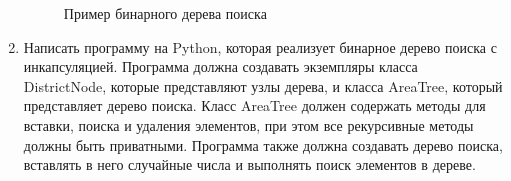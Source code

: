 \begin{enumerate}
\begin{figure}[h]
\centering
{}
\caption{Пример бинарного дерева поиска}
\end{figure}

\item Написать программу на Python, которая реализует бинарное дерево поиска с инкапсуляцией. Программа должна создавать экземпляры класса DistrictNode, которые представляют узлы дерева, и класса AreaTree, который представляет дерево поиска. Класс AreaTree должен содержать методы для вставки, поиска и удаления элементов, при этом все рекурсивные методы должны быть приватными. Программа также должна создавать дерево поиска, вставлять в него случайные числа и выполнять поиск элементов в дереве.


\end{enumerate}
